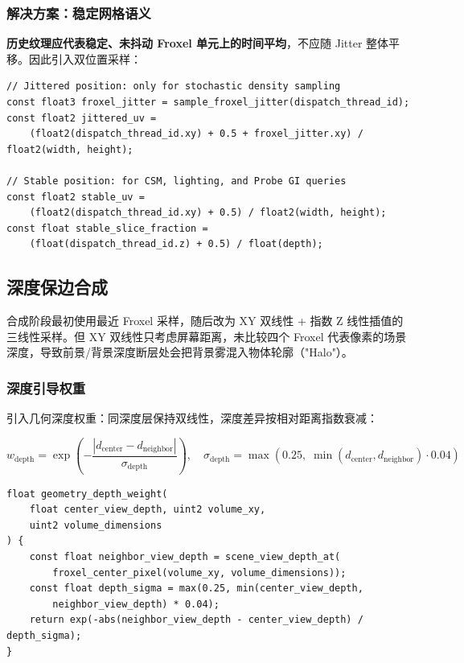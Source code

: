 \documentclass[11pt,a4paper]{article}
\begin{document}
\subsubsection{解决方案：稳定网格语义}

\textbf{历史纹理应代表稳定、未抖动 Froxel 单元上的时间平均}，不应随 Jitter 整体平移。因此引入双位置采样：

\begin{lstlisting}[language=HLSL, caption={InjectDensity.hlsl 中的稳定 vs 抖动二分法}]
// Jittered position: only for stochastic density sampling
const float3 froxel_jitter = sample_froxel_jitter(dispatch_thread_id);
const float2 jittered_uv =
    (float2(dispatch_thread_id.xy) + 0.5 + froxel_jitter.xy) / float2(width, height);

// Stable position: for CSM, lighting, and Probe GI queries
const float2 stable_uv =
    (float2(dispatch_thread_id.xy) + 0.5) / float2(width, height);
const float stable_slice_fraction =
    (float(dispatch_thread_id.z) + 0.5) / float(depth);
\end{lstlisting}

\subsection{深度保边合成}

合成阶段最初使用最近 Froxel 采样，随后改为 XY 双线性 + 指数 Z 线性插值的三线性采样。但 XY 双线性只考虑屏幕距离，未比较四个 Froxel 代表像素的场景深度，导致前景/背景深度断层处会把背景雾混入物体轮廓（"Halo"）。

\subsubsection{深度引导权重}

引入几何深度权重：同深度层保持双线性，深度差异按相对距离指数衰减：

\begin{equation}
w_{\text{depth}} = \exp\left(-\frac{|d_{\text{center}} - d_{\text{neighbor}}|}{\sigma_{\text{depth}}}\right), \quad
\sigma_{\text{depth}} = \max\left(0.25,\; \min(d_{\text{center}}, d_{\text{neighbor}}) \cdot 0.04\right)
\end{equation}

\begin{lstlisting}[language=HLSL, caption={CompositeVolumetricFog.hlsl 中的深度引导上采样}]
float geometry_depth_weight(
    float center_view_depth, uint2 volume_xy,
    uint2 volume_dimensions
) {
    const float neighbor_view_depth = scene_view_depth_at(
        froxel_center_pixel(volume_xy, volume_dimensions));
    const float depth_sigma = max(0.25, min(center_view_depth,
        neighbor_view_depth) * 0.04);
    return exp(-abs(neighbor_view_depth - center_view_depth) / depth_sigma);
}
\end{lstlisting}
\end{document}
